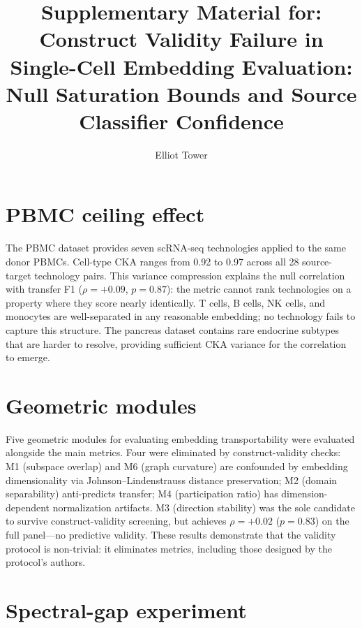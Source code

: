 \documentclass[11pt]{article}
\title{Supplementary Material for:\\
Construct Validity Failure in Single-Cell Embedding Evaluation:\\
Null Saturation Bounds and Source Classifier Confidence}
\author{Elliot Tower}
\date{}
\begin{document}
\maketitle

\setcounter{table}{0}
\renewcommand{\thetable}{S\arabic{table}}
\setcounter{figure}{0}
\renewcommand{\thefigure}{S\arabic{figure}}


\section{PBMC ceiling effect}
\label{app:pbmc}

The PBMC dataset \citep{ding2020systematic} provides seven scRNA-seq
technologies applied to the same donor PBMCs. Cell-type CKA ranges from
0.92 to 0.97 across all 28 source-target technology pairs. This
variance compression explains the null correlation with transfer F1
($\rho = +0.09$, $p = 0.87$): the metric cannot rank technologies on
a property where they score nearly identically. T cells, B cells, NK
cells, and monocytes are well-separated in any reasonable embedding; no
technology fails to capture this structure. The pancreas dataset contains
rare endocrine subtypes that are harder to resolve, providing sufficient
CKA variance for the correlation to emerge.


\section{Geometric modules}
\label{app:modules}

Five geometric modules for evaluating embedding transportability were
evaluated alongside the main metrics. Four were
eliminated by construct-validity checks: M1 (subspace overlap) and M6
(graph curvature) are confounded by embedding dimensionality via
Johnson--Lindenstrauss distance preservation; M2 (domain separability)
anti-predicts transfer; M4 (participation ratio) has
dimension-dependent normalization artifacts. M3 (direction stability)
was the sole candidate to survive construct-validity screening, but
achieves $\rho = +0.02$ ($p = 0.83$) on the full panel---no
predictive validity. These results demonstrate that the validity
protocol is non-trivial: it eliminates metrics, including those designed
by the protocol's authors.


\section{Spectral-gap experiment}
\label{app:spectral}
\end{document}
